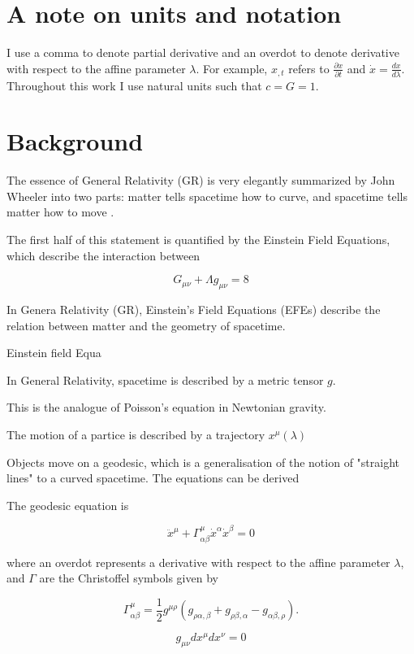 \section{A note on units and notation}
I use a comma to denote partial derivative and an overdot to denote derivative with respect to the affine parameter $\lambda$. For example, $x_{,t}$ refers to $\frac{\partial x}{\partial t}$ and $\dot{x} = \frac{dx}{d\lambda}$. Throughout this work I use natural units such that $c = G = 1$. 

\section{Background}

The essence of General Relativity (GR) is very elegantly summarized by John Wheeler into two parts: matter tells spacetime how to curve, and spacetime tells matter how to move \citep[pg.235]{wheeler2000geons}. 

The first half of this statement is quantified by the Einstein Field Equations, which describe the interaction between 

\begin{equation}
  G_{\mu \nu} + \Lambda g_{\mu \nu} = 8
  \label{eq:efes}
\end{equation}

In Genera Relativity (GR), Einstein's Field Equations (EFEs) describe the relation between matter and the geometry of spacetime. 

Einstein field Equa


In General Relativity, spacetime is described by a metric tensor $g$. 


This is the analogue of Poisson's equation in Newtonian gravity. 

The motion of a partice is described by a trajectory $x^{\mu}(\lambda)$

Objects move on a geodesic, which is a generalisation of the notion of "straight lines" to a curved spacetime. The equations can be derived 

The geodesic equation is 

\begin{equation}
  \ddot{x}^{\mu} + \Gamma^{\mu}_{\alpha \beta} \dot{x}^{\alpha} \dot{x}^{\beta} = 0 
  \label{eq:geodesic-eqn}
\end{equation}

where an overdot represents a derivative with respect to the affine parameter $\lambda$, and $\Gamma$ are the Christoffel symbols given by

\begin{equation}
  \Gamma^{\mu}_{\alpha \beta} = \frac{1}{2} g^{\mu \rho} (g_{\rho \alpha, \beta} + g_{\rho \beta, \alpha} - g_{\alpha \beta, \rho}).
  \label{eq:christoffels}
\end{equation}

\begin{equation}
  g_{\mu \nu} dx^{\mu} dx^{\nu} = 0
  \label{eq:null-condition}
\end{equation}

